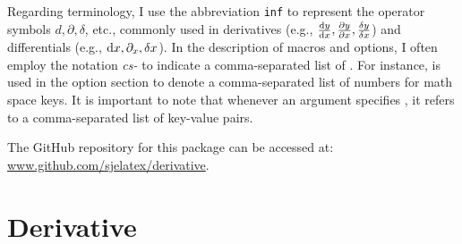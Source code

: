 

\bigskip

Regarding terminology, I use the abbreviation \texttt{inf} to represent the operator symbols $d, \partial, \delta$, etc., commonly used in derivatives (e.g., $\odv{y}{x}, \pdv{y}{x}, \fdv{y}{x}$) and differentials (e.g., $\odif{x}, \pdif{x}, \fdif{x}$). In the description of macros and options, I often employ the notation \emph{cs-} to indicate a comma-separated list of . For instance,  is used in the option section to denote a comma-separated list of numbers for math space keys. It is important to note that whenever an argument specifies , it refers to a comma-separated list of key-value pairs.

\bigskip

\noindent The GitHub repository for this package can be accessed at:\\ \href{https://github.com/sjelatex/derivative}{www.github.com/sjelatex/derivative}.


	
	\clearpage
	\section{Derivative}\label{sec:derivative}

